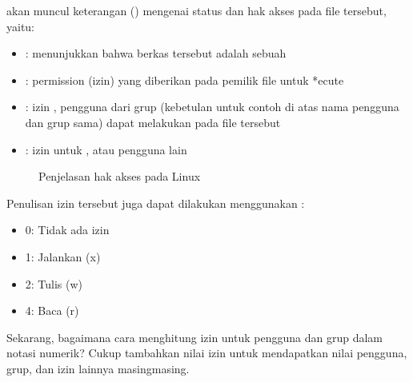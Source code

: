 \documentclass[letterpaper,10pt,english]{sphinxmanual}
\let\sphinxpxdimen\pdfpxdimen\else\newdimen\sphinxpxdimen
\begin{document}
akan muncul keterangan () mengenai status dan hak akses pada file tersebut, yaitu:
\begin{itemize}
\item {} 
 : menunjukkan bahwa berkas tersebut adalah sebuah 

\item {} 
 : permission (izin) yang diberikan pada pemilik file untuk *ecute

\item {} 
 : izin , pengguna dari grup  (kebetulan untuk contoh di atas nama pengguna dan grup sama) dapat melakukan  pada file tersebut

\item {} 
 : izin untuk , atau pengguna lain

\end{itemize}

\begin{figure}[htbp]
\centering
\capstart

\noindent\sphinxincludegraphics[height=500\sphinxpxdimen]{{2020-12-03-02-33-45}.png}
\caption{Penjelasan hak akses pada Linux}\label{\detokenize{sesi1/arsitektur:izin}}\end{figure}

Penulisan izin tersebut juga dapat dilakukan menggunakan :
\begin{itemize}
\item {} 
0: Tidak ada izin

\item {} 
1: Jalankan (x)

\item {} 
2: Tulis (w)

\item {} 
4: Baca (r)

\end{itemize}

Sekarang, bagaimana cara menghitung izin untuk pengguna dan grup dalam notasi numerik? Cukup tambahkan nilai izin untuk mendapatkan nilai pengguna, grup, dan izin lainnya masing\sphinxhyphen{}masing.
\end{document}
